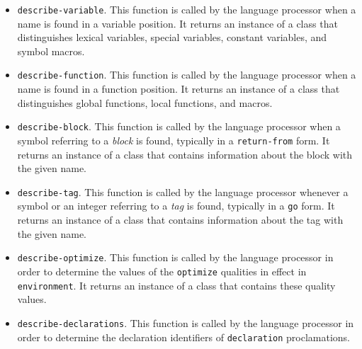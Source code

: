 \begin{itemize}
\item \texttt{describe-variable}.  This function is called by the
  language processor when a name is found in a variable position.  It
  returns an instance of a class that distinguishes lexical variables,
  special variables, constant variables, and symbol macros.
\item \texttt{describe-function}.  This function is called by the
  language processor when a name is found in a function position.  It
  returns an instance of a class that distinguishes global functions,
  local functions, and macros.
\item \texttt{describe-block}.  This function is called by the
  language processor when a symbol referring to a \emph{block} is
  found, typically in a \texttt{return-from} form.  It returns an
  instance of a class that contains information about the block with
  the given name.
\item \texttt{describe-tag}.  This function is called by the language
  processor whenever a symbol or an integer referring to a \emph{tag}
  is found, typically in a \texttt{go} form.  It returns an instance
  of a class that contains information about the tag with the given
  name.
\item \texttt{describe-optimize}.  This function is called by the
  language processor in order to determine the values of the
  \texttt{optimize} qualities in effect in \texttt{environment}.  It
  returns an instance of a class that contains these quality values.
\item \texttt{describe-declarations}.  This function is called by the
  language processor in order to determine the declaration identifiers
  of \texttt{declaration} proclamations.
\end{itemize}

